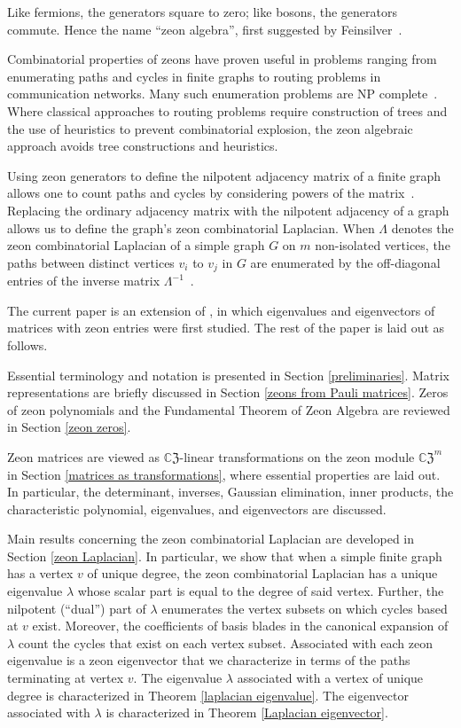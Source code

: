 \documentclass{article}
\theoremstyle{definition}
\newcommand{\CZ}{\mathbb{C}\mathfrak{Z}}
\numberwithin{equation}{section}
\begin{document}
Like fermions, the generators square to zero; like bosons, the generators commute.  Hence the name ``zeon algebra'', first suggested by Feinsilver~\cite{Feinsilverzeons}.

Combinatorial properties of zeons have proven useful in problems ranging from enumerating paths and cycles in finite graphs to routing problems in communication networks.  Many such enumeration problems are NP complete~\cite{Kar72}.  Where classical approaches to routing problems require construction of trees and the use of heuristics to prevent combinatorial explosion, the zeon algebraic approach avoids tree constructions and heuristics.  

Using zeon generators to define the nilpotent adjacency matrix of a finite graph allows one to count paths and cycles by considering powers of the matrix~\cite{ICCA7}.  Replacing the ordinary adjacency matrix with the nilpotent adjacency of a graph allows us to define the graph's zeon combinatorial Laplacian.  When $\Lambda$ denotes the zeon combinatorial Laplacian of a simple graph $G$ on $m$ non-isolated vertices, the paths between distinct vertices $v_i$ to $v_j$ in $G$ are enumerated by the off-diagonal entries of the inverse matrix $\Lambda^{-1}$~\cite{zeon laplacian}.  

The current paper is an extension of \cite{zeonspectraltheorem}, in which eigenvalues and eigenvectors of matrices with zeon entries were first studied.  The rest of the paper is laid out as follows.

Essential terminology and notation is presented in Section \ref{preliminaries}.  Matrix representations are briefly discussed in Section \ref{zeons from Pauli matrices}.  Zeros of zeon polynomials and the Fundamental Theorem of Zeon Algebra are reviewed in Section \ref{zeon zeros}.

Zeon matrices are viewed as $\CZ$-linear transformations on the zeon module $\CZ^m$ in Section \ref{matrices as transformations}, where essential properties are laid out.  In particular, the determinant, inverses, Gaussian elimination, inner products, the characteristic polynomial, eigenvalues, and eigenvectors are discussed.   

Main results concerning the zeon combinatorial Laplacian are developed in Section \ref{zeon Laplacian}.  In particular, we show that when a simple finite graph has a vertex $v$ of unique degree, the zeon combinatorial Laplacian has a unique eigenvalue $\lambda$ whose scalar part is equal to the degree of said vertex.  Further, the nilpotent (``dual'') part of $\lambda$ enumerates the vertex subsets on which cycles based at $v$ exist.  Moreover, the coefficients of basis blades in the canonical expansion of $\lambda$ count the cycles that exist on each vertex subset.  Associated with each zeon eigenvalue is a zeon eigenvector that we characterize in terms of the paths terminating at vertex $v$.   The eigenvalue $\lambda$ associated with a vertex of unique degree is characterized in Theorem \ref{laplacian eigenvalue}.  The eigenvector associated with $\lambda$ is characterized in Theorem \ref{Laplacian eigenvector}.
\end{document}
